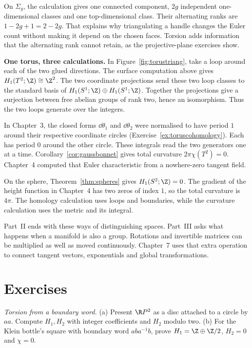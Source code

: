 On $\Sigma_g$, the calculation gives one connected component, $2g$ independent one-dimensional classes and one top-dimensional class. Their alternating ranks are $1-2g+1=2-2g$. That explains why triangulating a handle changes the Euler count without making it depend on the chosen faces. Torsion adds information that the alternating rank cannot retain, as the projective-plane exercises show.

\textbf{One torus, three calculations.} In Figure~\ref{fig:torustriang}, take a loop around each of the two glued directions. The surface computation above gives $H_1(T^2;\Z)\cong\Z^2$. The two coordinate projections send these two loop classes to the standard basis of $H_1(S^1;\Z)\oplus H_1(S^1;\Z)$. Together the projections give a surjection between free abelian groups of rank two, hence an isomorphism. Thus the two loops generate over the integers.

In Chapter~3, the closed forms $\dd\theta_1$ and $\dd\theta_2$ were normalised to have period $1$ around their respective coordinate circles (Exercise~\ref{ex:toruscohomology}). Each has period $0$ around the other circle. These integrals read the two generators one at a time. Corollary~\ref{cor:gaussbonnet} gives total curvature $2\pi\chi(T^2)=0$. Chapter~4 computed that Euler characteristic from a nowhere-zero tangent field.

On the sphere, Theorem~\ref{thm:spheres} gives $H_1(S^2;\Z)=0$. The gradient of the height function in Chapter~4 has two zeros of index $1$, so the total curvature is $4\pi$. The homology calculation uses loops and boundaries, while the curvature calculation uses the metric and its integral.

Part~II ends with these ways of distinguishing spaces. Part~III asks what happens when a manifold is also a group. Rotations and invertible matrices can be multiplied as well as moved continuously. Chapter~7 uses that extra operation to connect tangent vectors, exponentials and global transformations.

\section{Exercises}

\begin{exercise}[$\star$]\label{ex:kleinrp2}
\emph{Torsion from a boundary word.} (a) Present $\R P^2$ as a disc attached to a circle by $aa$. Compute $H_1,H_2$ with integer coefficients and $H_2$ modulo two. (b) For the Klein bottle's square with boundary word $aba^{-1}b$, prove $H_1=\Z\oplus\Z/2$, $H_2=0$ and $\chi=0$.
\end{exercise}

